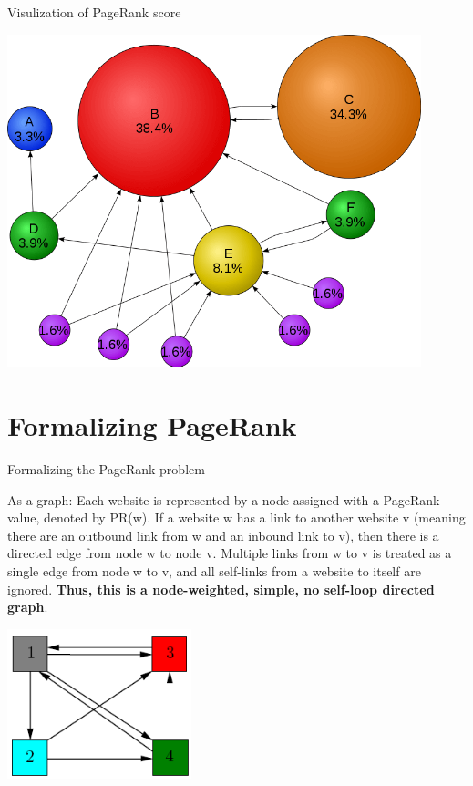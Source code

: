 \documentclass{beamer}
\begin{document}
\begin{frame}{Visulization of PageRank score}
    \begin{center}
        \includegraphics[width=0.9\textwidth]{pagerankexample.png}
    \end{center}
\end{frame}

\section{Formalizing PageRank}
\begin{frame}[t]{Formalizing the PageRank problem}
\begin{outline}
    \1 As a graph: Each website is represented by a node assigned with a PageRank value, denoted by PR(w). 
    \1 If a website w has a link to another website v (meaning there are an outbound link from w and an inbound link to v), then there is a directed edge from node w to node v. 
    \1 Multiple links from w to v is treated as a single edge from node w to v, and all self-links from a website to itself are ignored. \textbf{Thus, this is a node-weighted, simple, no self-loop directed graph}.
\end{outline}
\begin{center}
    \includegraphics[width=0.4\textwidth]{unweighted.png}
\end{center}
\end{frame}
\end{document}
